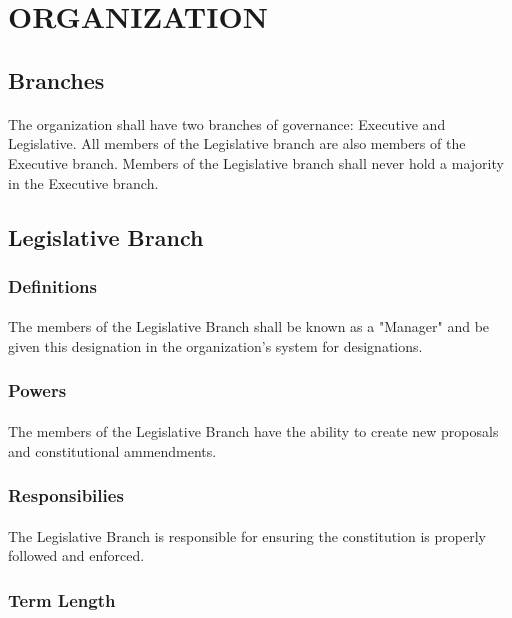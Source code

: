 \documentclass[10pt,a4paper]{article}
\begin{document}
\section{ORGANIZATION}
\subsection{Branches}
\paragraph{}
The organization shall have two branches of governance: Executive and Legislative.
All members of the Legislative branch are also members of the Executive branch. Members of the Legislative branch shall never hold a majority in the Executive branch.
\subsection{Legislative Branch}
\subsubsection{Definitions}
\paragraph{}
The members of the Legislative Branch shall be known as a "Manager" and be given this designation in the organization's system for designations.
\subsubsection{Powers}
\paragraph{}
The members of the Legislative Branch have the ability to create new proposals and constitutional ammendments.
\subsubsection{Responsibilies}
\paragraph{}
The Legislative Branch is responsible for ensuring the constitution is properly followed and enforced.
\subsubsection{Term Length}
\end{document}
